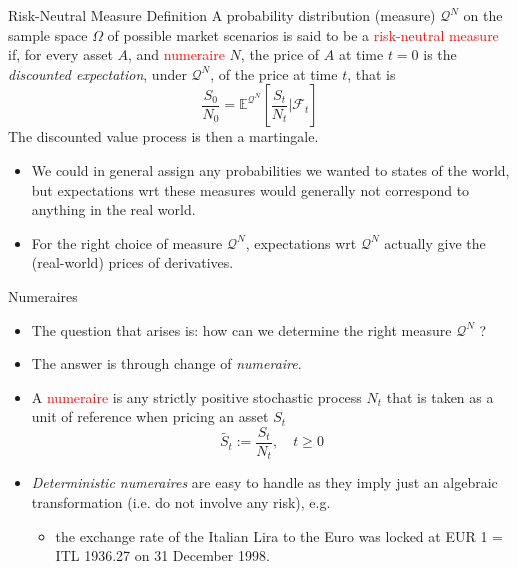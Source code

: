 \documentclass{beamer}
\begin{document}
\begin{frame}{}
	\begin{block}{Risk-Neutral Measure Definition}
	A probability distribution (measure) $\mathcal{Q}^N$ on the sample space $\Omega$ of possible market scenarios is said to be a \textcolor{red}{risk-neutral measure} if, for every asset $A$, and \textcolor{red}{numeraire} $N$, the price of $A$ at time $t=0$ is the \emph{discounted expectation}, under $\mathcal{Q}^N$, of the price at time $t$, that is
	\begin{equation}
		\frac{S_0}{N_0} = \mathbb{E}^{\mathcal{Q}^N}\left[\frac{S_t}{N_t}\bigg| \mathcal{F}_t\right]
		\label{eq:risk_neutral_pricing}
	\end{equation}
	The discounted value process is then a martingale.
	\end{block}
	\begin{itemize}
	\item We could in general assign any probabilities we wanted to states of the world, but expectations wrt these measures would generally not correspond to anything in the real world. 
	\item For the right choice of measure $\mathcal{Q}^N$, expectations wrt $\mathcal{Q}^N$ actually give the (real-world) prices of derivatives.
	\end{itemize}
\end{frame}

\begin{frame}{Numeraires}
	\begin{itemize}
	\item The question that arises is: how can we determine the right measure $\mathcal{Q}^N$ ?
	\item The answer is through change of \emph{numeraire}.
		\item A \textcolor{red}{numeraire} is any strictly positive stochastic process $N_t$ that is taken as a unit of reference when pricing an asset $S_t$
		\begin{equation*}
			\tilde{S_t}:=\frac{S_t}{N_t}, \quad t \ge 0
		\end{equation*}
		\item \emph{Deterministic numeraires} are easy to handle as they imply just an algebraic transformation (i.e. do not involve any risk), e.g.
		\begin{itemize}
			\item the exchange rate of the Italian Lira to the Euro was locked at EUR 1 = ITL 1936.27 on 31 December 1998.
		\end{itemize}
	\end{itemize}
\end{frame}
\end{document}
